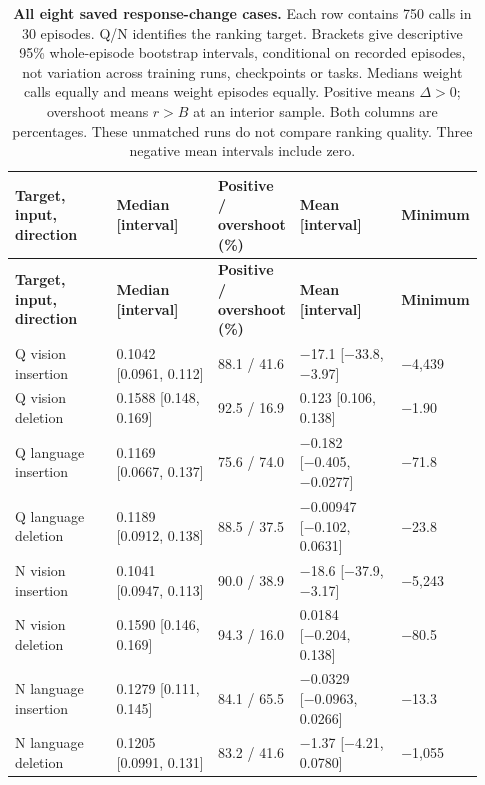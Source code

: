 \setlength{\tabcolsep}{2pt}
\begin{longtable}{p{0.230\linewidth} p{0.230\linewidth} p{0.140\linewidth} p{0.230\linewidth} p{0.100\linewidth}}
\caption{\textbf{All eight saved response-change cases.} Each row contains 750 calls in 30 episodes. Q/N identifies the ranking target. Brackets give descriptive 95\% whole-episode bootstrap intervals, conditional on recorded episodes, not variation across training runs, checkpoints or tasks. Medians weight calls equally and means weight episodes equally. Positive means $\Delta>0$; overshoot means $r>B$ at an interior sample. Both columns are percentages. These unmatched runs do not compare ranking quality. Three negative mean intervals include zero.}\label{tab:r1-saved-summary}\\
\toprule
\textbf{Target, input, direction} & \textbf{Median [interval]} & \textbf{Positive / overshoot (\%)} & \textbf{Mean [interval]} & \textbf{Minimum} \\
\midrule\endfirsthead
\toprule
\textbf{Target, input, direction} & \textbf{Median [interval]} & \textbf{Positive / overshoot (\%)} & \textbf{Mean [interval]} & \textbf{Minimum} \\
\midrule\endhead
\bottomrule\endfoot
Q vision insertion & 0.1042 [0.0961, 0.112] & 88.1 / 41.6 & −17.1 [−33.8, −3.97] & −4,439 \\
Q vision deletion & 0.1588 [0.148, 0.169] & 92.5 / 16.9 & 0.123 [0.106, 0.138] & −1.90 \\
Q language insertion & 0.1169 [0.0667, 0.137] & 75.6 / 74.0 & −0.182 [−0.405, −0.0277] & −71.8 \\
Q language deletion & 0.1189 [0.0912, 0.138] & 88.5 / 37.5 & −0.00947 [−0.102, 0.0631] & −23.8 \\
N vision insertion & 0.1041 [0.0947, 0.113] & 90.0 / 38.9 & −18.6 [−37.9, −3.17] & −5,243 \\
N vision deletion & 0.1590 [0.146, 0.169] & 94.3 / 16.0 & 0.0184 [−0.204, 0.138] & −80.5 \\
N language insertion & 0.1279 [0.111, 0.145] & 84.1 / 65.5 & −0.0329 [−0.0963, 0.0266] & −13.3 \\
N language deletion & 0.1205 [0.0991, 0.131] & 83.2 / 41.6 & −1.37 [−4.21, 0.0780] & −1,055 \\
\end{longtable}
